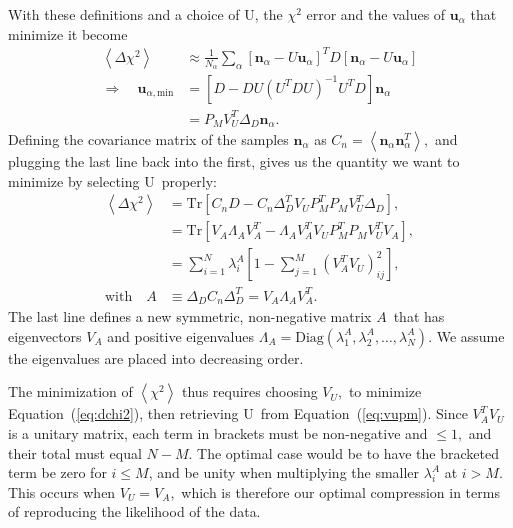 \documentclass[linenumbers, onecolumn]{aastex63}
\newcommand{\eqq}[1]{Equation~(\ref{#1})}
\newcommand{\vecn}{\ensuremath{\mathbf{n}}}
\newcommand{\vecu}{\ensuremath{\mathbf{u}}}
\newcommand{\covm}{C}
\newcommand{\matA}{\ensuremath{A}}
\newcommand{\matD}{D}
\newcommand{\matU}{U}
\newcommand{\matV}{V}
\newcommand{\proj}{P}  %
\newcommand{\DD}{\Delta_D}
\newcommand{\trace}{\text{Tr}}
\begin{document}
With these definitions and a choice of \matU, the $\chi^2$ error and the values of $\vecu_\alpha$ that minimize it become
\begin{align}
  \left\langle \Delta\chi^2 \right\rangle & \approx \frac{1}{N_\alpha} \sum_\alpha
                                            \left[ \vecn_\alpha - \matU \vecu_\alpha\right]^T \matD
                                            \left[ \vecn_\alpha - \matU \vecu_\alpha\right] \\
  \Rightarrow \quad \vecu_{\alpha,\text{min}} & = \left[ \matD -
                                                \matD\matU\left(\matU^{T}\matD\matU\right)^{-1}
                                                \matU^T\matD\right]\vecn_\alpha  \\
                                          & = \proj_M \matV_U^T \DD \vecn_\alpha.
\end{align}                                            
Defining the covariance matrix of the samples $\vecn_\alpha$ as
$\covm_n=\left\langle \vecn_\alpha \vecn^T_\alpha \right\rangle,$ and
plugging the last line back into the first,  gives us the quantity we
want to minimize by selecting \matU\ properly:
\begin{align}
  \left\langle \Delta \chi^2 \right\rangle 
  & = \trace\left[\covm_n\matD
    - \covm_n \DD^T \matV_U \proj_M^T \proj_M \matV_U^T \DD \right], \\
 & = \trace\left[\matV_A \Lambda_A \matV_A^T 
    - \Lambda_A  \matV_A^T \matV_U \proj_M^T \proj_M \matV_U^T
   \matV_A\right], \\
  & = \sum_{i=1}^N \lambda^A_i \left[ 1 - \sum_{j=1}^M (\matV^T_A
    \matV_U)^2_{ij}\right], \label{eq:dchi2} \\
  \text{with} \quad \matA & \equiv \DD \covm_n \DD^T = \matV_A \Lambda_A \matV_A^T.
\end{align}
The last line defines a new symmetric, non-negative matrix \matA\ that
has eigenvectors $\matV_A$ and positive eigenvalues $\Lambda_A=\text{Diag}(\lambda^A_1,
\lambda^A_2, \ldots, \lambda^A_N).$ We assume the eigenvalues are
placed into decreasing order.

The minimization of $\left\langle \chi^2 \right\rangle$ thus requires
choosing $\matV_U,$ to minimize \eqq{eq:dchi2}, then retrieving \matU\
from \eqq{eq:vupm}.  Since $\matV_A^T\matV_U$ is a unitary matrix,
each term in brackets must be non-negative and $\le 1,$ and their total must equal
$N-M$.  The optimal case would be to have the bracketed term be zero
for $i\le M$, and be unity when multiplying the smaller $\lambda^A_i$
at $i>M.$  This occurs when $\matV_U=\matV_A,$ which is therefore our
optimal compression in terms of reproducing the likelihood of the
data.
\end{document}
